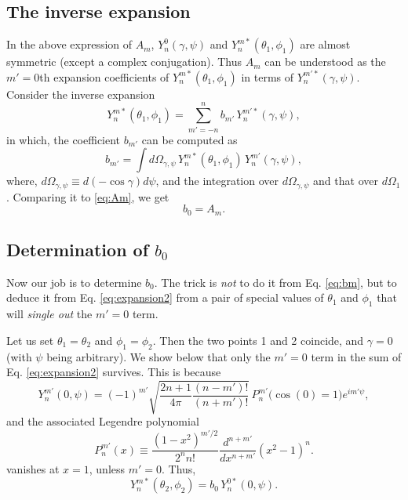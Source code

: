\documentclass[11pt]{article}
\begin{document}
\subsection{The inverse expansion}



In the above expression of $A_m$,
$Y_n^0(\gamma, \psi)$ and $Y_n^{m*}(\theta_1, \phi_1)$
are almost symmetric (except a complex conjugation).
%
Thus $A_m$
can be understood as the $m'=0$th expansion coefficients
of $Y_n^{m*}(\theta_1, \phi_1)$
in terms of $Y_n^{m'*}(\gamma, \psi)$.
%
Consider the inverse expansion
\begin{equation}
  Y_n^{m*}(\theta_1, \phi_1)
=
  \sum_{m' = -n}^n b_{m'} \,Y_n^{m'*}(\gamma, \psi),
  \label{eq:expansion2}
\end{equation}
in which,
the coefficient $b_{m'}$ can be computed as
\begin{equation}
  b_{m'}
=
  \int d \Omega_{\gamma,\psi} \,
  Y_n^{m*}(\theta_1, \phi_1) \,
  Y_n^{m'}(\gamma, \psi),
  \label{eq:bm}
\end{equation}
where, $d\Omega_{\gamma, \psi} \equiv d(-\cos\gamma) d\psi$,
and the integration over $d\Omega_{\gamma, \psi}$
and that over $d\Omega_1$.
Comparing it to \eqref{eq:Am}, we get
\begin{equation}
  b_0 = A_m.
  \label{eq:b0Am}
\end{equation}



\subsection{Determination of $b_0$}


Now our job is to determine $b_0$.
The trick is \emph{not} to do it from Eq. \eqref{eq:bm},
but to deduce it from Eq. \eqref{eq:expansion2}
from a pair of special values of $\theta_1$ and $\phi_1$
that will \emph{single out} the $m' = 0$ term.

Let us set $\theta_1 = \theta_2$ and $\phi_1 = \phi_2$.
Then the two points 1 and 2 coincide,
and $\gamma = 0$ (with $\psi$ being arbitrary).
%
We show below that only the $m' = 0$ term in the sum
of Eq. \eqref{eq:expansion2} survives.
%
This is because
\begin{equation}
  Y_n^{m'}(0, \psi)
=
  (-1)^{m'}
  \sqrt{
    \frac{ 2 n + 1 } { 4 \pi }
    \frac{ (n - m')! } { (n + m')! }
  }
  \,
  P_{n}^{m'}\bigl( \cos(0) = 1 \bigr) e^{i m' \psi},
  \label{eq:Ynm0}
\end{equation}
and the associated Legendre polynomial
\begin{equation}
  P_{n}^{m'}(x)
\equiv
  \frac{ (1 - x^2)^{m'/2} } { 2^{n} n! }
  \frac{ d^{n+m'} } { d x^{n+m'} } (x^2 - 1)^{n}.
  \label{eq:Pnm}
\end{equation}
vanishes at $x = 1$, unless $m' = 0$.
Thus,
\[
Y_n^{m*}(\theta_2, \phi_2)
=
b_0 \, Y_n^{0*}(0, \psi).
\]
\end{document}
